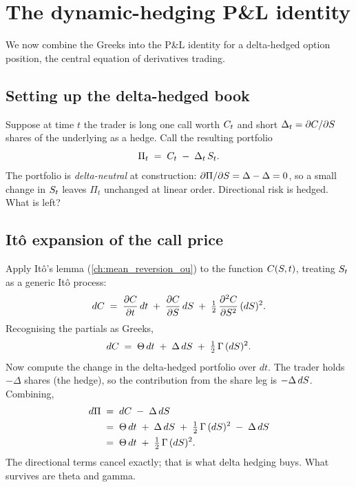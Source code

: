 \section{The dynamic-hedging P\&L identity}
\label{sec:ch16_pnl_identity}

We now combine the Greeks into the P\&L identity for a
delta-hedged option position, the central equation of
derivatives trading.

\subsection{Setting up the delta-hedged book}
\label{subsec:ch16_book_setup}

Suppose at time $t$ the trader is long one call worth $C_t$
and short $\Delta_t = \partial C/\partial S$ shares of the
underlying as a hedge. Call the resulting portfolio
\begin{equation}
  \Pi_t \;=\; C_t \;-\; \Delta_t\,S_t.
  \label{eq:dh_portfolio}
\end{equation}
The portfolio is \emph{delta-neutral} at construction: $\partial
\Pi/\partial S = \Delta - \Delta = 0$, so a small change in
$S_t$ leaves $\Pi_t$ unchanged at linear order. Directional
risk is hedged. What is left?

\subsection{It\^o expansion of the call price}
\label{subsec:ch16_ito}

Apply It\^o's lemma (\cref{ch:mean_reversion_ou}) to the function
$C(S, t)$, treating $S_t$ as a generic It\^o process:
\begin{equation}
  dC \;=\; \frac{\partial C}{\partial t}\,dt
            \;+\; \frac{\partial C}{\partial S}\,dS
            \;+\; \tfrac12\,\frac{\partial^2 C}{\partial S^2}\,(dS)^2.
  \label{eq:ito_call}
\end{equation}
Recognising the partials as Greeks,
\begin{equation}
  dC \;=\; \Theta\,dt \;+\; \Delta\,dS \;+\; \tfrac12\,\Gamma\,(dS)^2.
  \label{eq:dC_greeks}
\end{equation}
Now compute the change in the delta-hedged portfolio over $dt$. The
trader holds $-\Delta$ shares (the hedge), so the contribution from
the share leg is $-\Delta\,dS$. Combining,
\begin{align}
  d\Pi \;&=\; dC \;-\; \Delta\,dS \nonumber \\
       \;&=\; \Theta\,dt \;+\; \Delta\,dS \;+\; \tfrac12\,\Gamma\,(dS)^2
              \;-\; \Delta\,dS \nonumber \\
       \;&=\; \Theta\,dt \;+\; \tfrac12\,\Gamma\,(dS)^2.
  \label{eq:dPi_raw}
\end{align}
The directional terms cancel exactly; that is what delta
hedging buys. What survives are theta and gamma.

